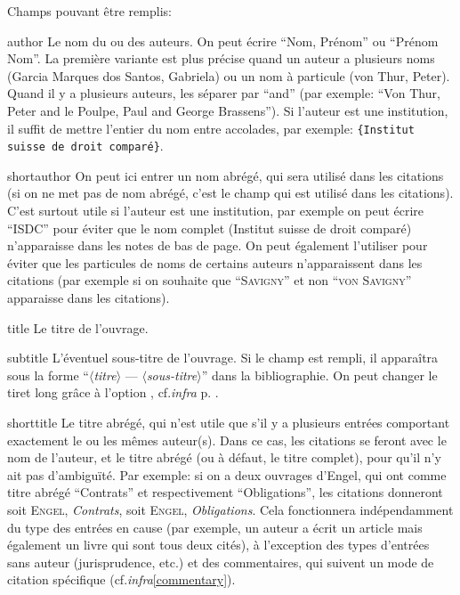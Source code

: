 \documentclass[a4paper]{ltxdockit}[2011/03/25]
\newcommand{\infra}{\emph{infra}\xspace}
\newcommand{\cf}{cf.\xspace}
\newcommand{\GM}{\enquote}
\newcommand{\pex}{\textnormal{par exemple}\xspace}
\newcommand{\Pex}{\textnormal{Par exemple}\xspace}
\newcommand{\variable}[1]{$\langle$\textsl{#1}$\rangle$}
\begin{document}
Champs pouvant être remplis:
\begin{marglist}
\item[author] \label{author}Le nom du ou des auteurs. On peut écrire \GM{Nom, Prénom} ou \GM{Prénom Nom}. La première variante est plus précise quand un auteur a plusieurs noms (Garcia Marques dos Santos, Gabriela) ou un nom à particule (von Thur, Peter). Quand il y a plusieurs auteurs, les séparer par \GM{and} (\pex: \GM{Von Thur, Peter and le Poulpe, Paul and George Brassens}). Si l'auteur est une institution, il suffit de mettre l'entier du nom entre accolades, \pex: \verb/{Institut suisse de droit comparé}/. 


\item[shortauthor]\label{shortauthor}On peut ici entrer un nom abrégé, qui sera utilisé dans les citations (si on ne met pas de nom abrégé, c'est le champ  qui est utilisé dans les citations). C'est surtout utile si l'auteur est une institution, \pex on peut écrire \GM{ISDC} pour éviter que le nom complet (Institut suisse de droit comparé) n'apparaisse dans les notes de bas de page. On peut également l'utiliser pour éviter que les particules de noms de certains auteurs n'apparaissent dans les citations (\pex si on souhaite que \GM{\textsc{Savigny}} et non \GM{\textsc{von Savigny}} apparaisse dans les citations).

\item[title]\label{title}Le titre de l'ouvrage.

\item[subtitle]\label{subtitle}L'éventuel sous-titre de l'ouvrage. Si le champ est rempli, il apparaîtra sous la forme \GM{\variable{titre} --- \variable{sous-titre}} dans la bibliographie. On peut changer le tiret long grâce à l'option , \cf \infra p. \pageref{punctsubtitle}.

\item[shorttitle]\label{shorttitle}Le titre abrégé, qui n'est utile que s'il y a plusieurs entrées comportant exactement le ou les mêmes auteur(s). Dans ce cas, les citations se feront avec le nom de l'auteur, et le titre abrégé (ou à défaut, le titre complet), pour qu'il n'y ait pas d'ambiguïté. \Pex: si on a deux ouvrages d'Engel, qui ont comme titre abrégé \GM{Contrats} et respectivement \GM{Obligations}, les citations donneront soit \textsc{Engel}, \emph{Contrats}, soit \textsc{Engel}, \emph{Obligations}. Cela fonctionnera indépendamment du type des entrées en cause (par exemple, un auteur a écrit un article mais également un livre qui sont tous deux cités), à l'exception des types d'entrées sans auteur (jurisprudence, etc.) et des commentaires, qui suivent un mode de citation spécifique (\cf \infra \ref{commentary}).


\end{marglist}
\end{document}
